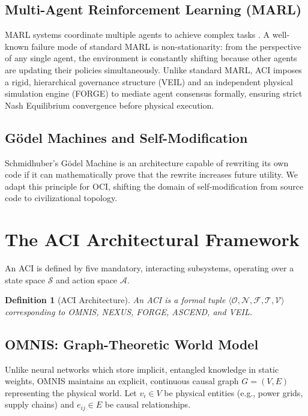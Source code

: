 \documentclass[12pt,a4paper]{article}
\newtheorem{definition}{Definition}
\begin{document}
\subsection{Multi-Agent Reinforcement Learning (MARL)}
MARL systems coordinate multiple agents to achieve complex tasks \cite{busoniu2008comprehensive}. A well-known failure mode of standard MARL is non-stationarity: from the perspective of any single agent, the environment is constantly shifting because other agents are updating their policies simultaneously. Unlike standard MARL, ACI imposes a rigid, hierarchical governance structure (VEIL) and an independent physical simulation engine (FORGE) to mediate agent consensus formally, ensuring strict Nash Equilibrium convergence before physical execution.

\subsection{G\"odel Machines and Self-Modification}
Schmidhuber's G\"odel Machine \cite{schmidhuber2006godel} is an architecture capable of rewriting its own code if it can mathematically prove that the rewrite increases future utility. We adapt this principle for OCI, shifting the domain of self-modification from source code to civilizational topology.

\section{The ACI Architectural Framework}
\label{sec:aci}
An ACI is defined by five mandatory, interacting subsystems, operating over a state space $\mathcal{S}$ and action space $\mathcal{A}$.

\begin{definition}[ACI Architecture]
An ACI is a formal tuple $\langle \mathcal{O}, \mathcal{N}, \mathcal{F}, \mathcal{T}, \mathcal{V} \rangle$ corresponding to OMNIS, NEXUS, FORGE, ASCEND, and VEIL.
\end{definition}

\subsection{OMNIS: Graph-Theoretic World Model}
Unlike neural networks which store implicit, entangled knowledge in static weights, OMNIS maintains an explicit, continuous causal graph $G = (V, E)$ representing the physical world. Let $v_i \in V$ be physical entities (e.g., power grids, supply chains) and $e_{ij} \in E$ be causal relationships. 
\end{document}
